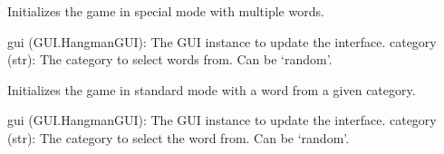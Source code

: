 \documentclass[letterpaper,10pt,english]{sphinxmanual}
\begin{document}

\begin{fulllineitems}
\label{\detokenize{modules:Game_Logic.setup_special_mode}}
\pysigstartsignatures
{}
\pysigstopsignatures
\sphinxAtStartPar
Initializes the game in special mode with multiple words.
\begin{description}
\sphinxAtStartPar
gui (GUI.HangmanGUI): The GUI instance to update the interface.
category (str): The category to select words from. Can be ‘random’.

\end{description}

\end{fulllineitems}


\begin{fulllineitems}
\label{\detokenize{modules:Game_Logic.setup_standard_mode}}
\pysigstartsignatures
{}
\pysigstopsignatures
\sphinxAtStartPar
Initializes the game in standard mode with a word from a given category.
\begin{description}
\sphinxAtStartPar
gui (GUI.HangmanGUI): The GUI instance to update the interface.
category (str): The category to select the word from. Can be ‘random’.

\end{description}

\end{fulllineitems}

\end{document}
